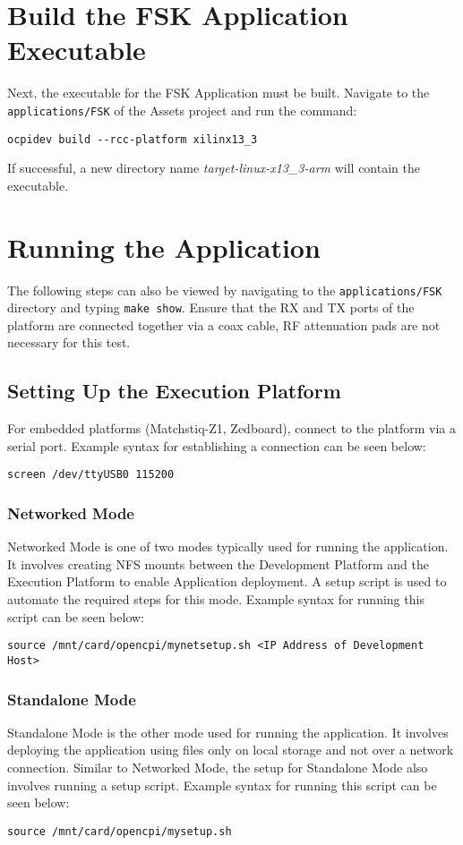 \begin{flushleft}
\section{Build the FSK Application Executable}
Next, the executable for the FSK Application must be built. Navigate to the \texttt{applications/FSK} of the Assets project and run the command:
\begin{verbatim}
ocpidev build --rcc-platform xilinx13_3
\end{verbatim}
If successful, a new directory name \textit{target-linux-x13\_3-arm} will contain the executable.

\section{Running the Application}
The following steps can also be viewed by navigating to the \texttt{applications/FSK} directory and typing \texttt{make show}. Ensure that the RX and TX ports of the platform are connected together via a coax cable, RF attenuation pads are not necessary for this test.
\subsection{Setting Up the Execution Platform}
For embedded platforms (Matchstiq-Z1, Zedboard), connect to the platform via a serial port. Example syntax for establishing a connection can be seen below:
\begin{verbatim}
screen /dev/ttyUSB0 115200
\end{verbatim}
\subsubsection{Networked Mode}
Networked Mode is one of two modes typically used for running the application. It involves creating NFS mounts between the Development Platform and the Execution Platform to enable Application deployment. A setup script is used to automate the required steps for this mode. Example syntax for running this script can be seen below:
\begin{verbatim}
source /mnt/card/opencpi/mynetsetup.sh <IP Address of Development Host>
\end{verbatim}
\subsubsection{Standalone Mode}
Standalone Mode is the other mode used for running the application. It involves deploying the application using files only on local storage and not over a network connection. Similar to Networked Mode, the setup for Standalone Mode also involves running a setup script. Example syntax for running this script can be seen below:
\begin{verbatim}
source /mnt/card/opencpi/mysetup.sh
\end{verbatim}

\end{flushleft}
